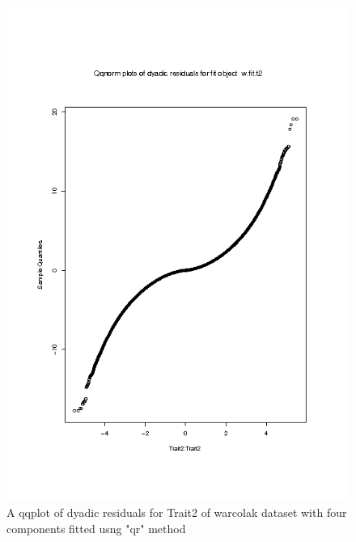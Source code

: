 %

\begin{figure}[h]
  \centering
  \includegraphics[width=1.1\textwidth]{Rplot002.png}
  \caption{A qqplot of dyadic residuals for Trait2 of warcolak dataset
           with four components fitted usng "qr" method}
  \label{fig:2}
\end{figure}

%

